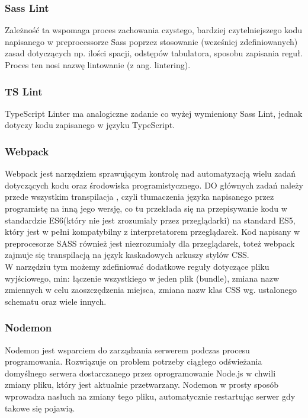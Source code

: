 \documentclass[eng,printmode]{mgr}
\begin{document}
\subsubsection{Sass Lint}
Zależność ta \cite {SASS_LINT} wspomaga proces zachowania czystego, bardziej czytelniejszego kodu napisanego w preprocessorze  Sass poprzez stosowanie (wcześniej zdefiniowanych) zasad dotyczących np. ilości spacji, odstępów tabulatora, sposobu zapisania reguł. Proces ten nosi nazwę lintowanie (z ang. lintering).

\subsubsection{TS Lint}
TypeScript Linter \cite {TS_LINT} ma analogiczne zadanie co wyżej wymieniony Sass Lint, jednak dotyczy kodu zapisanego w języku TypeScript.

\subsubsection{Webpack}
Webpack \cite {WEBPACK} jest narzędziem sprawującym kontrolę nad automatyzacją wielu zadań dotyczących kodu oraz środowiska programistycznego. DO głównych zadań należy przede wszystkim transpilacja \cite {TRANSPILE}, czyli tłumaczenia języka napisanego przez programistę na inną jego wersję, co tu przekłada się na przepisywanie kodu w standardzie ES6(który nie jest zrozumiały przez przeglądarki) na standard ES5, który jest w pełni kompatybilny z interpretatorem przeglądarek. Kod napisany w preprocesorze SASS również jest niezrozumiały dla przeglądarek, toteż webpack zajmuje się transpilacją na język kaskadowych arkuszy stylów CSS.
\\
W narzędziu tym możemy zdefiniować dodatkowe reguły dotyczące pliku wyjściowego, min: łączenie wszystkiego w jeden plik (bundle), zmiana nazw zmiennych w celu zaoszczędzenia miejsca, zmiana nazw klas CSS wg. ustalonego schematu oraz wiele innych.

\subsubsection{Nodemon}
Nodemon \cite {NODEMON} jest wsparciem do zarządzania serwerem podczas procesu programowania. Rozwiązuje on problem potrzeby ciągłego odświeżania domyślnego serwera dostarczanego przez oprogramowanie Node.js w chwili zmiany pliku, który jest aktualnie przetwarzany. Nodemon w prosty sposób wprowadza nasłuch na zmiany tego pliku, automatycznie restartując serwer gdy takowe się pojawią.
\end{document}
